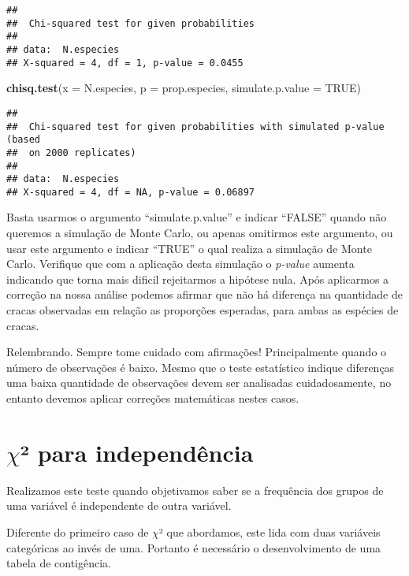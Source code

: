 \documentclass[titlepage, oneside, openany, a4paper]{book}
\newenvironment{Shaded}{\begin{snugshade}}{\end{snugshade}}
\newcommand{\DataTypeTok}[1]{\textcolor[rgb]{0.13,0.29,0.53}{#1}}
\newcommand{\KeywordTok}[1]{\textcolor[rgb]{0.13,0.29,0.53}{\textbf{#1}}}
\newcommand{\NormalTok}[1]{#1}
\newcommand{\OtherTok}[1]{\textcolor[rgb]{0.56,0.35,0.01}{#1}}
\begin{document}
\begin{verbatim}
## 
##  Chi-squared test for given probabilities
## 
## data:  N.especies
## X-squared = 4, df = 1, p-value = 0.0455
\end{verbatim}

\begin{Shaded}
\begin{Highlighting}[]
\KeywordTok{chisq.test}\NormalTok{(}\DataTypeTok{x =}\NormalTok{ N.especies, }\DataTypeTok{p =}\NormalTok{ prop.especies, }\DataTypeTok{simulate.p.value =} \OtherTok{TRUE}\NormalTok{)}
\end{Highlighting}
\end{Shaded}

\begin{verbatim}
## 
##  Chi-squared test for given probabilities with simulated p-value (based
##  on 2000 replicates)
## 
## data:  N.especies
## X-squared = 4, df = NA, p-value = 0.06897
\end{verbatim}

Basta usarmos o argumento ``simulate.p.value'' e indicar ``FALSE'' quando não queremos a simulação de Monte Carlo, ou apenas omitirmos este argumento, ou usar este argumento e indicar ``TRUE'' o qual realiza a simulação de Monte Carlo. Verifique que com a aplicação desta simulação o \emph{p-value} aumenta indicando que torna mais dificil rejeitarmos a hipótese nula. Após aplicarmos a correção na nossa análise podemos afirmar que não há diferença na quantidade de cracas observadas em relação as proporções esperadas, para ambas as espécies de cracas.

Relembrando. Sempre tome cuidado com afirmações! Principalmente quando o número de observações é baixo. Mesmo que o teste estatístico indique diferenças uma baixa quantidade de observações devem ser analisadas cuidadosamente, no entanto devemos aplicar correções matemáticas nestes casos.

\hypertarget{chi-para-independuxeancia}{%
\section{\texorpdfstring{\(\chi\)² para independência}{\textbackslash{}chi² para independência}}\label{chi-para-independuxeancia}}

Realizamos este teste quando objetivamos saber se a frequência dos grupos de uma variável é independente de outra variável.

Diferente do primeiro caso de \(\chi\)² que abordamos, este lida com duas variáveis categóricas ao invés de uma. Portanto é necessário o desenvolvimento de uma tabela de contigência.
\end{document}
